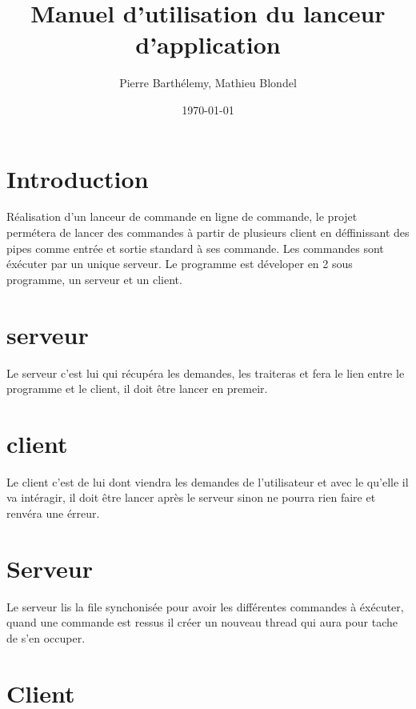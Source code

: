 \documentclass[12pt]{article}
\title{Manuel d'utilisation du lanceur d'application}
\author{Pierre Barthélemy, Mathieu Blondel}
\date{\today}
\begin{document}
\maketitle
\newpage
\tableofcontents
\newpage
\section{Introduction}
    Réalisation d'un lanceur de commande en ligne de commande, le projet permétera de lancer des commandes à partir de plusieurs client en déffinissant des pipes comme entrée et sortie standard à ses commande. Les commandes sont éxécuter par un unique serveur.
    Le programme est déveloper en 2 sous programme, un serveur et un client.
\section*{serveur}
    Le serveur c'est lui qui récupéra les demandes, les traiteras et fera le lien entre le programme et le client, il doit être lancer en premeir.
\section*{client}
    Le client c'est de lui dont viendra les demandes de l'utilisateur et avec le qu'elle il va intéragir, il doit être lancer après le serveur sinon ne pourra rien faire et renvéra une érreur.
\newpage

\section{Serveur}
    Le serveur lis la file synchonisée pour avoir les différentes commandes à éxécuter, quand une commande est ressus il créer un nouveau thread qui aura pour tache de s'en occuper.

\newpage
\section{Client}
\end{document}
